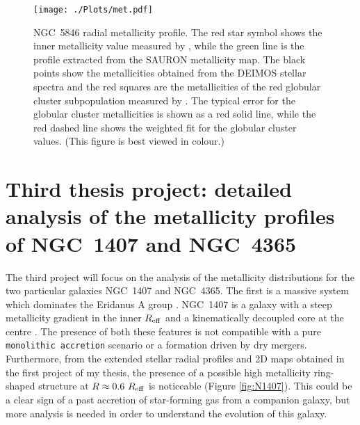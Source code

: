 \begin{figure}
\centering
    	\begin{center}
			\texttt{[image: ./Plots/met.pdf]}
		\end{center}
	    \caption[]{NGC~5846 radial metallicity profile. 
	    The red star symbol shows the inner metallicity value measured by \citet{Tang09}, while the green 
	    line is the profile extracted from the SAURON metallicity map. 
	    The black points show the metallicities obtained from the DEIMOS stellar spectra and the red squares are the metallicities of 
	    the red globular cluster subpopulation measured by \citet{Usher12}. 
	    The typical error for the globular cluster metallicities is shown as a red solid line, while the red dashed line 
	    shows the weighted fit for the globular cluster values. 
		(This figure is best viewed in colour.) 
	    }
    \label{fig:SkimsGC}
  \end{figure}

  
  
  
  
  
  
  
\section{Third thesis project: detailed analysis of the metallicity profiles of NGC~1407 and NGC~4365}  
%
  The third project will focus on the analysis of the metallicity distributions for the two 
  particular galaxies NGC~1407 and NGC~4365.
  The first is a massive system which dominates the Eridanus A group \citep{Brough06}. 
  NGC~1407 is a galaxy with a steep metallicity gradient in the inner $R_{\rm{eff}}$ and a kinematically 
  decoupled core at the centre \citep{Spolaor08a}. 
  The presence of both these features is not compatible with a pure \texttt{monolithic accretion} scenario or a 
  formation driven by dry mergers. 
  Furthermore, from the extended stellar radial profiles and 2D maps obtained in the first project of my thesis, the presence 
  of a possible high metallicity ring-shaped structure at $R\approx0.6~R_{\rm{eff}}$ is noticeable (Figure \ref{fig:N1407}).  
  This could be a clear sign of a past accretion of star-forming gas from a companion galaxy, 
  but more analysis is needed in order to understand the evolution of this galaxy. 
  
